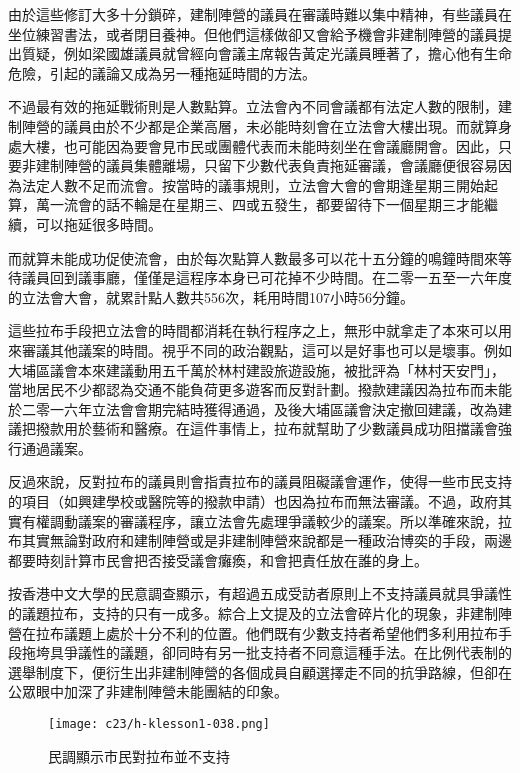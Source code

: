 由於這些修訂大多十分鎖碎，建制陣營的議員在審議時難以集中精神，有些議員在坐位練習書法，或者閉目養神。但他們這樣做卻又會給予機會非建制陣營的議員提出質疑，例如梁國雄議員就曾經向會議主席報告黃定光議員睡著了，擔心他有生命危險，引起的議論又成為另一種拖延時間的方法。

不過最有效的拖延戰術則是人數點算。立法會內不同會議都有法定人數的限制，建制陣營的議員由於不少都是企業高層，未必能時刻會在立法會大樓出現。而就算身處大樓，也可能因為要會見市民或團體代表而未能時刻坐在會議廳開會。因此，只要非建制陣營的議員集體離場，只留下少數代表負責拖延審議，會議廳便很容易因為法定人數不足而流會。按當時的議事規則，立法會大會的會期逢星期三開始起算，萬一流會的話不輪是在星期三、四或五發生，都要留待下一個星期三才能繼續，可以拖延很多時間。

而就算未能成功促使流會，由於每次點算人數最多可以花十五分鐘的鳴鐘時間來等待議員回到議事廳，僅僅是這程序本身已可花掉不少時間。在二零一五至一六年度的立法會大會，就累計點人數共556次，耗用時間107小時56分鐘。

這些拉布手段把立法會的時間都消耗在執行程序之上，無形中就拿走了本來可以用來審議其他議案的時間。視乎不同的政治觀點，這可以是好事也可以是壞事。例如大埔區議會本來建議動用五千萬於林村建設旅遊設施，被批評為「林村天安門」，當地居民不少都認為交通不能負荷更多遊客而反對計劃。撥款建議因為拉布而未能於二零一六年立法會會期完結時獲得通過，及後大埔區議會決定撤回建議，改為建議把撥款用於藝術和醫療。在這件事情上，拉布就幫助了少數議員成功阻擋議會強行通過議案。

反過來說，反對拉布的議員則會指責拉布的議員阻礙議會運作，使得一些市民支持的項目（如興建學校或醫院等的撥款申請）也因為拉布而無法審議。不過，政府其實有權調動議案的審議程序，讓立法會先處理爭議較少的議案。所以準確來說，拉布其實無論對政府和建制陣營或是非建制陣營來說都是一種政治博奕的手段，兩邊都要時刻計算市民會把否接受議會癱瘓，和會把責任放在誰的身上。

按香港中文大學的民意調查顯示，有超過五成受訪者原則上不支持議員就具爭議性的議題拉布，支持的只有一成多。綜合上文提及的立法會碎片化的現象，非建制陣營在拉布議題上處於十分不利的位置。他們既有少數支持者希望他們多利用拉布手段拖垮具爭議性的議題，卻同時有另一批支持者不同意這種手法。在比例代表制的選舉制度下，便衍生出非建制陣營的各個成員自顧選擇走不同的抗爭路線，但卻在公眾眼中加深了非建制陣營未能團結的印象。

\begin{figure}[htbp]
    \centering
    \texttt{[image: c23/h-klesson1-038.png]}
    \caption{民調顯示市民對拉布並不支持} 
\end{figure}

